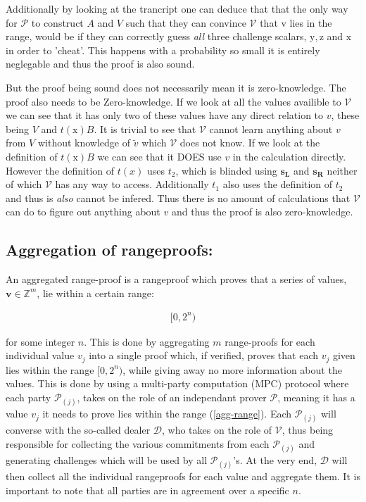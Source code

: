 \documentclass{article}
\newcommand{\eqn}[2]{\begin{equation}\label{#1}\begin{split}#2\end{split}\end{equation}}
\renewcommand{\vec}[1]{\boldsymbol{#1}}
\newcommand{\ran}[1]{\mathrm{#1}}
\newcommand{\vecran}[1]{\mathbf{#1}}
\newcommand{\V}{\mathcal{V}}
\renewcommand{\P}{\mathcal{P}}
\newcommand{\D}{\mathcal{D}}
\newcommand{\Z}{\mathbb{Z}}
\newcommand{\tv}{\widetilde{v}}
\begin{document}
Additionally by looking at the trancript one can deduce that that the
only way for $\P$ to construct $A$ and $V$ such that they can convince
$\V$ that v lies in the range, would be if they can correctly guess
\textit{all} three challenge scalars, $\ran{y}, \ran{z}$ and $\ran{x}$
in order to 'cheat'. This happens with a probability so small it is
entirely neglegable and thus the proof is also sound.

But the proof being sound does not necessarily mean it is
zero-knowledge. The proof also needs to be Zero-knowledge. If we look
at all the values availible to $\V$ we can see that it has only two
of these values have any direct relation to $v$, these being $V$ and
$t(\ran{x})B$. It is trivial to see that $\V$ cannot learn anything
about $v$ from $V$ without knowledge of $\tv$ which $\V$ does not
know. If we look at the definition of $t(\ran{x})B$ we can see that
it DOES use $v$ in the calculation directly. However the definition
of $t(x)$ uses $t_2$, which is blinded using $\vecran{s_L}$ and
$\vecran{s_R}$ neither of which $\V$ has any way to access. Additionally
$t_1$ also uses the definition of $t_2$ and thus is \textit{also} cannot
be infered. Thus there is no amount of calculations that $\V$ can do to
figure out anything about $v$ and thus the proof is also zero-knowledge.

\subsection{Aggregation of rangeproofs:}

An aggregated range-proof is a rangeproof which proves that a series
of values, $\vec{v} \in \Z^m$, lie within a certain range:

\eqn{agg-range}{
	[0,2^n)
}

for some integer $n$. This is done by aggregating $m$ range-proofs for
each individual value $v_j$ into a single proof which, if verified,
proves that each $v_j$ given lies within the range $[0,2^n)$, while
giving away no more information about the values. This is done by using
a multi-party computation (MPC) protocol where each party $\P_{(j)}$,
takes on the role of an independant prover $\P$, meaning it has a value
$v_j$ it needs to prove lies within the range (\ref{agg-range}). Each
$\P_{(j)}$ will converse with the so-called dealer $\D$, who takes on
the role of $\V$, thus being responsible for collecting the various
commitments from each $\P_{(j)}$ and generating challenges which will
be used by all $\P_{(j)}$'s. At the very end, $\D$ will then collect
all the individual rangeproofs for each value and aggregate them. It is
important to note that all parties are in agreement over a specific $n$.
\end{document}
